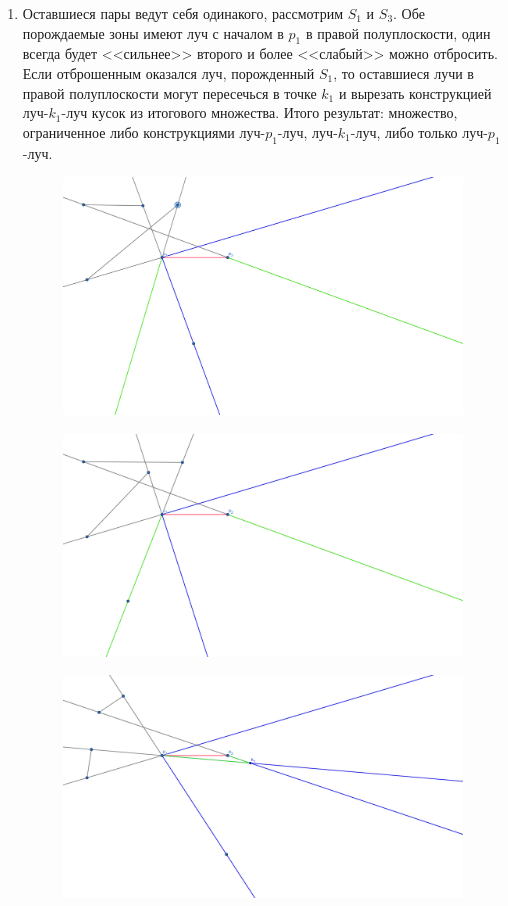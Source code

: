 \documentclass[letterpaper,12pt]{article}
\begin{document}
\begin{enumerate}
\begin{figure}[H]
            \end{figure}
      \item Оставшиеся пары ведут себя одинакого, рассмотрим
            $S_1$ и $S_3$. Обе порождаемые зоны имеют луч с
            началом в $p_1$ в правой полуплоскости, 
            один всегда будет <<сильнее>> второго и более
            <<слабый>> можно отбросить. Если отброшенным оказался
            луч, порожденный $S_1$, то оставшиеся лучи в правой
            полуплоскости могут пересечься в точке $k_1$
            и вырезать конструкцией луч-$k_1$-луч кусок из
            итогового множества. Итого результат: множество, 
            ограниченное либо конструкциями луч-$p_1$-луч, 
            луч-$k_1$-луч, либо только луч-$p_1$-луч.
            \begin{figure}[H]
                  \centering
                  \includegraphics[width=0.5\linewidth]{nozone_2_4.png}
            \end{figure}
            \begin{figure}[H]
                  \centering
                  \includegraphics[width=0.5\linewidth]{nozone_2_5.png}
            \end{figure}
            \begin{figure}[H]
                  \centering
                  \includegraphics[width=0.5\linewidth]{nozone_2_6.png}

\end{figure}
\end{enumerate}
\end{document}
